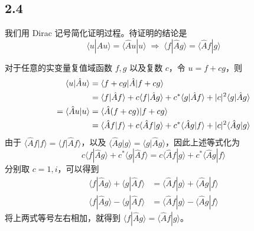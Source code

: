 \subsection{2.4}
我们用 Dirac 记号简化证明过程。待证明的结论是
\begin{equation}
\langle u | \hat A u \rangle = \langle \hat A u | u \rangle \; \Rightarrow \; \langle f | \hat A g \rangle = \langle \hat A f | g \rangle
\end{equation}

对于任意的实变量复值域函数 $f, g$ 以及复数 $c$，令 $u = f + c g$，则
\begin{align}
\langle u | \hat A u \rangle
&= \langle f + c g | \hat A | f + c g \rangle \notag\\
&= \langle f | \hat A f \rangle + c \langle f | \hat A g \rangle + c^* \langle g | \hat A f \rangle + |c|^2 \langle g | \hat A g \rangle \\
= \langle \hat A u | u \rangle
&= \langle \hat A (f + c g) | f + c g \rangle \notag\\
&= \langle \hat A f | f \rangle + c \langle \hat A f | g \rangle + c^* \langle \hat A g | f \rangle + |c|^2 \langle \hat A g | g \rangle
\end{align}
由于 $\langle \hat A f | f \rangle = \langle f | \hat A f \rangle$，以及 $\langle \hat A g | g \rangle = \langle g | \hat A g \rangle$，因此上述等式化为
\begin{equation}
c \langle f | \hat A g \rangle + c^* \langle g | \hat A f \rangle
= c \langle \hat A f | g \rangle + c^* \langle \hat A g | f \rangle
\end{equation}
分别取 $c = 1, i$，可以得到
\begin{align}
\langle f | \hat A g \rangle + \langle g | \hat A f \rangle
&= \langle \hat A f | g \rangle + \langle \hat A g | f \rangle \\
\langle f | \hat A g \rangle - \langle g | \hat A f \rangle
&= \langle \hat A f | g \rangle - \langle \hat A g | f \rangle
\end{align}
将上两式等号左右相加，就得到 $\langle f | \hat A g \rangle = \langle \hat A f | g \rangle$。

